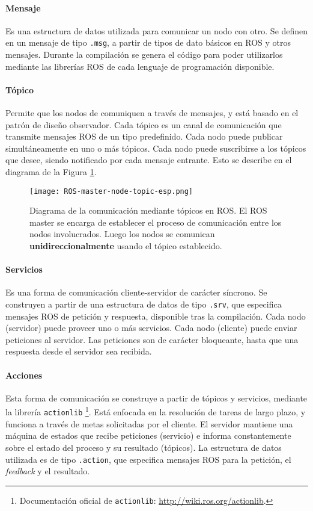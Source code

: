 \paragraph{Mensaje} Es una estructura de datos utilizada para comunicar un nodo con otro. Se definen en un mensaje de tipo \texttt{.msg}, a partir de tipos de dato básicos en ROS y otros mensajes. Durante la compilación se genera el código para poder utilizarlos mediante las librerías ROS de cada lenguaje de programación disponible.

\paragraph{Tópico} Permite que los nodos de comuniquen a través de mensajes, y está basado en el patrón de diseño observador. Cada tópico es un canal de comunicación que transmite mensajes ROS de un tipo predefinido. Cada nodo puede publicar simultáneamente en uno o más tópicos. Cada nodo puede suscribirse a los tópicos que desee, siendo notificado por cada mensaje entrante. Esto se describe en el diagrama de la Figura \ref{img:ros-topic}.

\begin{figure}[!h]
	\centering
	\texttt{[image: ROS-master-node-topic-esp.png]}
	\caption{\small Diagrama de la comunicación mediante tópicos en ROS. El ROS master se encarga de establecer el proceso de comunicación entre los nodos involucrados. Luego los nodos se comunican {\bfseries unidireccionalmente} usando el tópico establecido.}
	\label{img:ros-topic}
\end{figure}

\paragraph{Servicios} Es una forma de comunicación cliente-servidor de carácter síncrono. Se construyen a partir de una estructura de datos de tipo \texttt{.srv}, que especifica mensajes ROS de petición y respuesta, disponible tras la compilación. Cada nodo (servidor) puede proveer uno o más servicios. Cada nodo (cliente) puede enviar peticiones al servidor. Las peticiones son de carácter bloqueante, hasta que una respuesta desde el servidor sea recibida.

\paragraph{Acciones} Esta forma de comunicación se construye a partir de tópicos y servicios, mediante la librería \texttt{actionlib} \footnote{Documentación oficial de \texttt{actionlib}: \url{http://wiki.ros.org/actionlib}.}. Está enfocada en la resolución de tareas de largo plazo, y funciona a través de metas solicitadas por el cliente. El servidor mantiene una máquina de estados que recibe peticiones (servicio) e informa constantemente sobre el estado del proceso y su resultado (tópicos). La estructura de datos utilizada es de tipo \texttt{.action}, que especifica mensajes ROS para la petición, el \textit{feedback} y el resultado.

